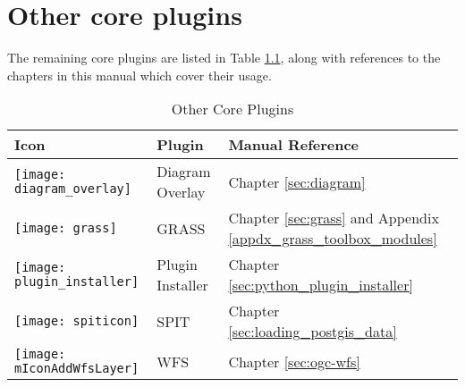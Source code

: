 
\chapter{Other core plugins}


The remaining core plugins are listed in Table \ref{tab:other_core}, along with references to 
the chapters in this manual which cover their usage.

\begin{table}[H]
\centering
\caption{Other Core Plugins}\label{tab:other_core}\medskip
\small
 \begin{tabular}{|l|l|p{4in}|}
\hline \textbf{Icon} & \textbf{Plugin} & \textbf{Manual Reference}\\
\hline
\texttt{[image: diagram\_overlay]}
 & Diagram Overlay \index{plugins!diagram}& Chapter \ref{sec:diagram}\\
\hline
\texttt{[image: grass]}
 & GRASS \index{plugin!grass toolbox} & Chapter \ref{sec:grass} and Appendix \ref{appdx_grass_toolbox_modules}\\
 \hline
\texttt{[image: plugin\_installer]}
 & Plugin Installer \index{plugins!Plugin Installer} & Chapter \ref{sec:python_plugin_installer}\\
\hline
\texttt{[image: spiticon]}
 & SPIT \index{plugins!spit}& Chapter \ref{sec:loading_postgis_data} \\
 \hline
\texttt{[image: mIconAddWfsLayer]}
 & WFS & Chapter \ref{sec:ogc-wfs} \\
\hline
\end{tabular}
\end{table}
